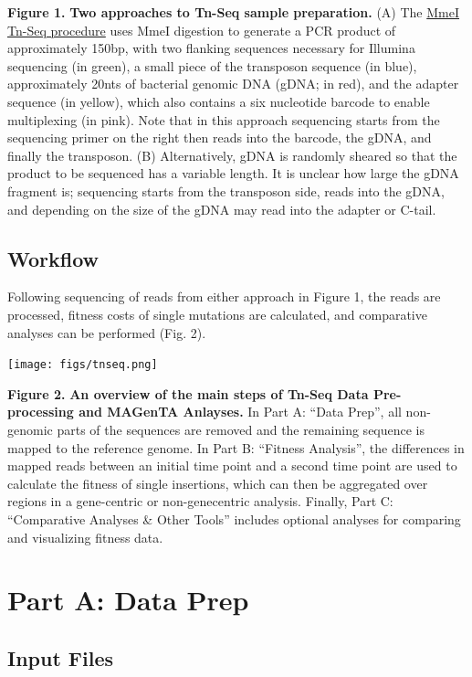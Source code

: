 \documentclass[11pt,]{article}
\begin{document}
\noindent
\textbf{Figure 1.} \textbf{Two approaches to Tn-Seq sample preparation.}
(A) The
\href{http://www.nature.com/nmeth/journal/v6/n10/abs/nmeth.1377.html}{MmeI
Tn-Seq procedure} uses MmeI digestion to generate a PCR product of
approximately 150bp, with two flanking sequences necessary for Illumina
sequencing (in green), a small piece of the transposon sequence (in
blue), approximately 20nts of bacterial genomic DNA (gDNA; in red), and
the adapter sequence (in yellow), which also contains a six nucleotide
barcode to enable multiplexing (in pink). Note that in this approach
sequencing starts from the sequencing primer on the right then reads
into the barcode, the gDNA, and finally the transposon. (B)
Alternatively, gDNA is randomly sheared so that the product to be
sequenced has a variable length. It is unclear how large the gDNA
fragment is; sequencing starts from the transposon side, reads into the
gDNA, and depending on the size of the gDNA may read into the adapter or
C-tail.

\subsection{Workflow}\label{workflow}

Following sequencing of reads from either approach in Figure 1, the
reads are processed, fitness costs of single mutations are calculated,
and comparative analyses can be performed (Fig. 2).

\centerline{\texttt{[image: figs/tnseq.png]}}

\noindent
\textbf{Figure 2.} \textbf{An overview of the main steps of Tn-Seq Data
Pre-processing and MAGenTA Anlayses.} In Part A: ``Data Prep'', all
non-genomic parts of the sequences are removed and the remaining
sequence is mapped to the reference genome. In Part B: ``Fitness
Analysis'', the differences in mapped reads between an initial time
point and a second time point are used to calculate the fitness of
single insertions, which can then be aggregated over regions in a
gene-centric or non-genecentric analysis. Finally, Part C: ``Comparative
Analyses \& Other Tools'' includes optional analyses for comparing and
visualizing fitness data. \pagebreak

\section{Part A: Data Prep}\label{part-a-data-prep}

\subsection{Input Files}\label{input-files}
\end{document}
